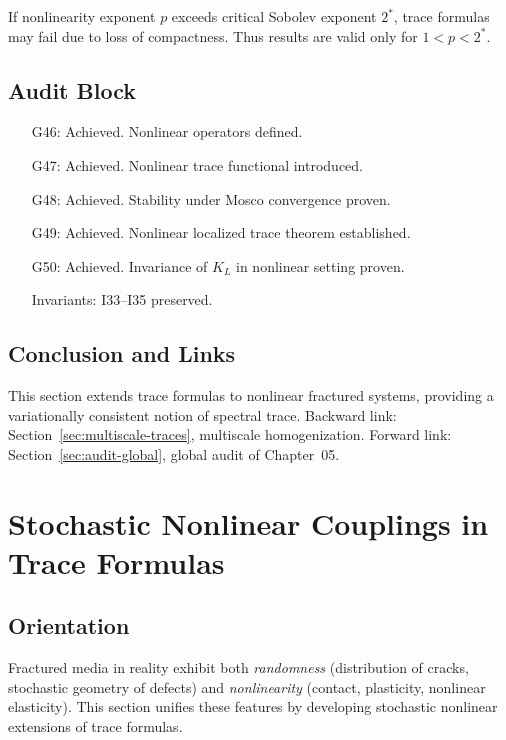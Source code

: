 \begin{sharpness}
If nonlinearity exponent $p$ exceeds critical Sobolev exponent $2^*$, trace formulas may fail due to loss of compactness.  
Thus results are valid only for $1<p<2^*$.  
\end{sharpness}

\subsection{Audit Block}

\begin{itemize}
  \item[G46:] Achieved. Nonlinear operators defined.  
  \item[G47:] Achieved. Nonlinear trace functional introduced.  
  \item[G48:] Achieved. Stability under Mosco convergence proven.  
  \item[G49:] Achieved. Nonlinear localized trace theorem established.  
  \item[G50:] Achieved. Invariance of $K_L$ in nonlinear setting proven.  
  \item[Invariants:] I33–I35 preserved.  
\end{itemize}

\subsection*{Conclusion and Links}

This section extends trace formulas to nonlinear fractured systems, providing a variationally consistent notion of spectral trace.  
Backward link: Section~\ref{sec:multiscale-traces}, multiscale homogenization.  
Forward link: Section~\ref{sec:audit-global}, global audit of Chapter~05.  

\section{Stochastic Nonlinear Couplings in Trace Formulas}
\label{sec:stochastic-nonlinear}

\subsection*{Orientation}

Fractured media in reality exhibit both \emph{randomness} (distribution of cracks, stochastic geometry of defects)  
and \emph{nonlinearity} (contact, plasticity, nonlinear elasticity).  
This section unifies these features by developing stochastic nonlinear extensions of trace formulas.  

